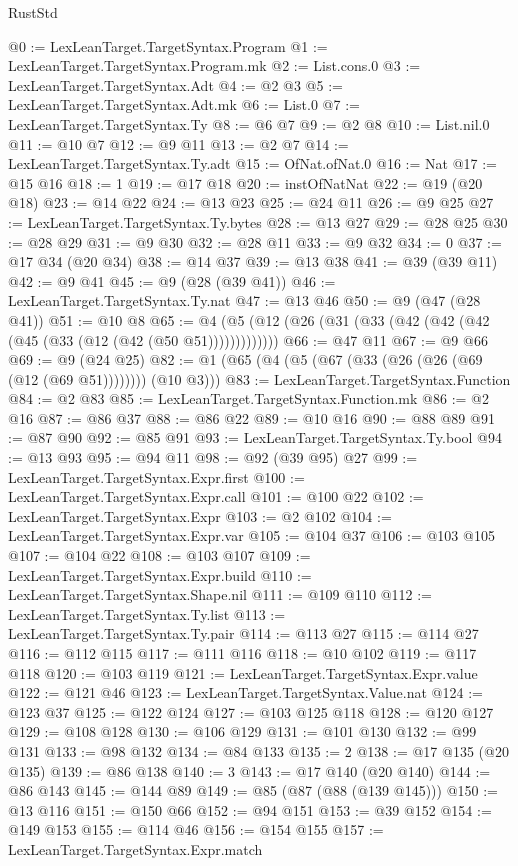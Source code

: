 \begin{lexlean}{RustStd}
\begin{coremodule}
@0 := LexLeanTarget.TargetSyntax.Program
@1 := LexLeanTarget.TargetSyntax.Program.mk
@2 := List.cons.{0}
@3 := LexLeanTarget.TargetSyntax.Adt
@4 := @2 @3
@5 := LexLeanTarget.TargetSyntax.Adt.mk
@6 := List.{0}
@7 := LexLeanTarget.TargetSyntax.Ty
@8 := @6 @7
@9 := @2 @8
@10 := List.nil.{0}
@11 := @10 @7
@12 := @9 @11
@13 := @2 @7
@14 := LexLeanTarget.TargetSyntax.Ty.adt
@15 := OfNat.ofNat.{0}
@16 := Nat
@17 := @15 @16
@18 := 1
@19 := @17 @18
@20 := instOfNatNat
@22 := @19 (@20 @18)
@23 := @14 @22
@24 := @13 @23
@25 := @24 @11
@26 := @9 @25
@27 := LexLeanTarget.TargetSyntax.Ty.bytes
@28 := @13 @27
@29 := @28 @25
@30 := @28 @29
@31 := @9 @30
@32 := @28 @11
@33 := @9 @32
@34 := 0
@37 := @17 @34 (@20 @34)
@38 := @14 @37
@39 := @13 @38
@41 := @39 (@39 @11)
@42 := @9 @41
@45 := @9 (@28 (@39 @41))
@46 := LexLeanTarget.TargetSyntax.Ty.nat
@47 := @13 @46
@50 := @9 (@47 (@28 @41))
@51 := @10 @8
@65 := @4 (@5 (@12 (@26 (@31 (@33 (@42 (@42 (@42 (@45 (@33 (@12 (@42 (@50 @51)))))))))))))
@66 := @47 @11
@67 := @9 @66
@69 := @9 (@24 @25)
@82 := @1 (@65 (@4 (@5 (@67 (@33 (@26 (@26 (@69 (@12 (@69 @51)))))))) (@10 @3)))
@83 := LexLeanTarget.TargetSyntax.Function
@84 := @2 @83
@85 := LexLeanTarget.TargetSyntax.Function.mk
@86 := @2 @16
@87 := @86 @37
@88 := @86 @22
@89 := @10 @16
@90 := @88 @89
@91 := @87 @90
@92 := @85 @91
@93 := LexLeanTarget.TargetSyntax.Ty.bool
@94 := @13 @93
@95 := @94 @11
@98 := @92 (@39 @95) @27
@99 := LexLeanTarget.TargetSyntax.Expr.first
@100 := LexLeanTarget.TargetSyntax.Expr.call
@101 := @100 @22
@102 := LexLeanTarget.TargetSyntax.Expr
@103 := @2 @102
@104 := LexLeanTarget.TargetSyntax.Expr.var
@105 := @104 @37
@106 := @103 @105
@107 := @104 @22
@108 := @103 @107
@109 := LexLeanTarget.TargetSyntax.Expr.build
@110 := LexLeanTarget.TargetSyntax.Shape.nil
@111 := @109 @110
@112 := LexLeanTarget.TargetSyntax.Ty.list
@113 := LexLeanTarget.TargetSyntax.Ty.pair
@114 := @113 @27
@115 := @114 @27
@116 := @112 @115
@117 := @111 @116
@118 := @10 @102
@119 := @117 @118
@120 := @103 @119
@121 := LexLeanTarget.TargetSyntax.Expr.value
@122 := @121 @46
@123 := LexLeanTarget.TargetSyntax.Value.nat
@124 := @123 @37
@125 := @122 @124
@127 := @103 @125 @118
@128 := @120 @127
@129 := @108 @128
@130 := @106 @129
@131 := @101 @130
@132 := @99 @131
@133 := @98 @132
@134 := @84 @133
@135 := 2
@138 := @17 @135 (@20 @135)
@139 := @86 @138
@140 := 3
@143 := @17 @140 (@20 @140)
@144 := @86 @143
@145 := @144 @89
@149 := @85 (@87 (@88 (@139 @145)))
@150 := @13 @116
@151 := @150 @66
@152 := @94 @151
@153 := @39 @152
@154 := @149 @153
@155 := @114 @46
@156 := @154 @155
@157 := LexLeanTarget.TargetSyntax.Expr.match

\end{coremodule}
\end{lexlean}

